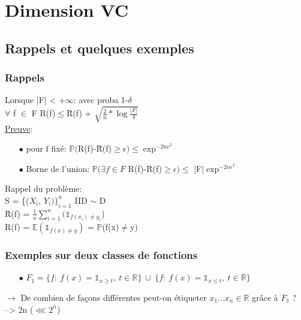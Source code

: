 \documentclass[a4paper]{report}
\begin{document}
\chapter*{Dimension VC}

\section{Rappels et quelques exemples}
\subsection*{Rappels}
Lorsque |F| < $ +\infty $: avec proba 1-$ \delta $\\
$ \forall $ f $ \in $ F R(f)$ \leq $\^R(f) + $\sqrt{\frac{2}{n}*\log\frac{|F|}{\delta}}$\\
\newline
\underline{Preuve}:\\
\begin{itemize}
\item[$\bullet$] pour f fixé: $\mathds{P}($R(f)-\^R(f)$\geq \epsilon)\leq \exp ^{-2n\epsilon ^2}$
\item[$\bullet$] Borne de l'union: $\mathds{P}(\exists f\in F$ R(f)-\^R(f)$\geq \epsilon)\leq $ |F|$\exp ^{-2n\epsilon ^2}$\\
\end{itemize}

\begin{tiny}
Rappel du problème:\\
S = \{($X_i$, $Y_i)\}_{i=1}^n$ IID $ \sim $ D\\
\^R(f) = $\frac{1}{n}\displaystyle { \sum_{i=1}^{n}}( \mathds{1}_{f(x_i)\neq y_i} $)\\
R(f) = $\mathds{E}(\mathds{1}_{ f(x)\neq y })$ = $\mathds{P}$(f(x)$\neq$y)\\
\end{tiny}


\subsection*{Exemples sur deux classes de fonctions}
\begin{itemize}
\item[$\bullet$] $F_1 = \{f:\ f(x)=\mathds{1}_{x\geq t},\ t\in \mathds{R}\}
\ \cup \ \{f:\ f(x)=\mathds{1}_{x\leq t},\ t\in \mathds{R}\}$\\
\end{itemize}
$\rightarrow$ De combien de façons différentes peut-on étiqueter $x_1...x_n \in \mathds{R}$ grâce à $F_1$ ?\\
--> 2n ($\lll 2^n$)\\
\end{document}
